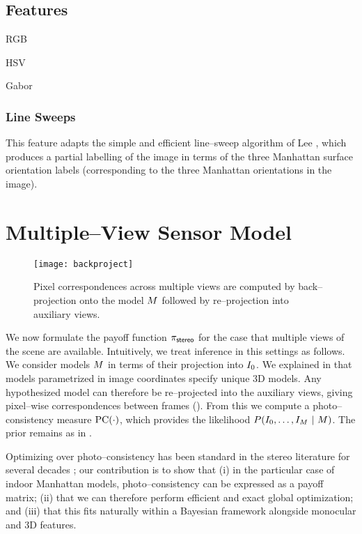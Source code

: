 \subsection{Features}

RGB

HSV

Gabor

\subsubsection{Line Sweeps}
\label{sect:orient-est}

This feature adapts the simple and efficient line--sweep algorithm of
Lee \etal \cite{Lee09}, which produces a partial labelling of the
image in terms of the three Manhattan surface orientation labels
(corresponding to the three Manhattan orientations in the image). 

\section{Multiple--View Sensor Model}

\begin{figure}[tb]
  \centering \texttt{[image: backproject]}
  \caption{Pixel correspondences across multiple views are computed by
    back--projection onto the model $\Scene$ followed by re--projection into
    auxiliary views.}
  \label{fig:backproject}
\end{figure}
We now formulate the payoff function $\StereoPayoff$ for the case that
multiple views of the scene are available. Intuitively, we treat
inference in this settings as follows. We consider models $\Scene$ in
terms of their projection into $\Image_0$. We explained in
 that models parametrized in image coordinates specify
unique 3D models. Any hypothesized model can therefore be
re--projected into the auxiliary views, giving pixel--wise
correspondences between frames (\cf {}). From this
we compute a photo--consistency measure $\pc(\cdot)$, which provides
the likelihood $P(\StereoData ~|~ \Scene)$. The prior remains as in
.

Optimizing over photo--consistency has been standard in the stereo
literature for several decades \cite{Scharstein01}; our contribution
is to show that (i) in the particular case of indoor Manhattan models,
photo--consistency can be expressed as a payoff matrix; (ii) that we
can therefore perform efficient and exact global optimization; and
(iii) that this fits naturally within a Bayesian framework alongside
monocular and 3D features.

